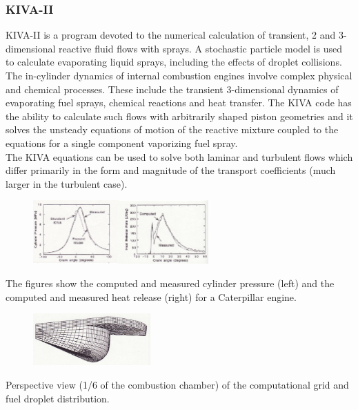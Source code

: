 \documentclass[12pt]{article}
\begin{document}
\subsubsection{KIVA-II}

KIVA-II is a program devoted to the numerical calculation of transient, 2 and 3-dimensional reactive fluid flows with sprays. A stochastic particle model is used to calculate evaporating liquid sprays, including the effects of droplet collisions.\\
The in-cylinder dynamics of internal combustion engines involve complex physical and chemical processes. These include the transient 3-dimensional dynamics of evaporating fuel sprays, chemical reactions and heat transfer. The KIVA code has the ability to calculate such flows with arbitrarily shaped piston geometries and it solves the unsteady equations of motion of the reactive mixture coupled to the equations for a single component vaporizing fuel spray.\\
The KIVA equations can be used to solve both laminar and turbulent flows which differ primarily in the form and magnitude of the transport coefficients (much larger in the turbulent case).

\begin{figure}[h!]
\centering
\includegraphics[width=0.6\textwidth]{figures/kiva.png}
\end{figure}

The figures show the computed and measured cylinder pressure (left) and the computed and measured heat release (right) for a Caterpillar engine.

\begin{figure}[h!]
\centering
\includegraphics[width=0.4\textwidth]{figures/grid.png}
\end{figure}

Perspective view (1/6 of the combustion chamber) of the computational grid and fuel droplet distribution.
\end{document}
